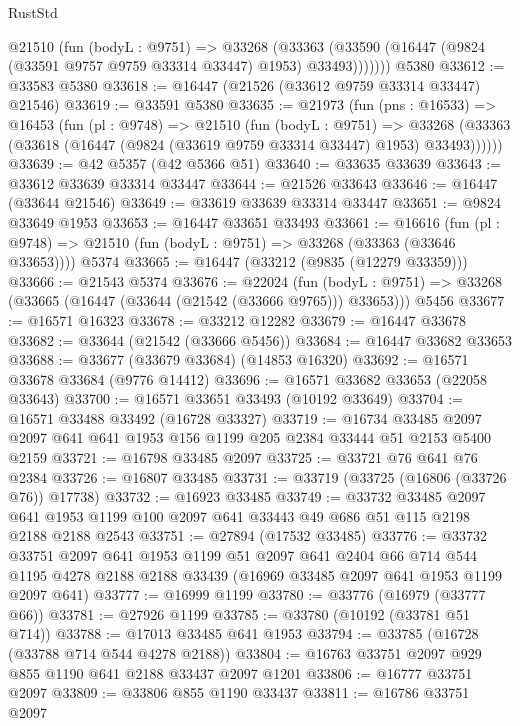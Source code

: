 \begin{lexlean}{RustStd}
\begin{coremodule}
        @21510
          (fun (bodyL : @9751) =>
          @33268
            (@33363 (@33590 (@16447 (@9824 (@33591 @9757 @9759 @33314 @33447) @1953) @33493)))))))
    @5380
@33612 := @33583 @5380
@33618 := @16447 (@21526 (@33612 @9759 @33314 @33447) @21546)
@33619 := @33591 @5380
@33635 := @21973
    (fun (pns : @16533) =>
    @16453
      (fun (pl : @9748) =>
      @21510
        (fun (bodyL : @9751) =>
        @33268 (@33363 (@33618 (@16447 (@9824 (@33619 @9759 @33314 @33447) @1953) @33493))))))
@33639 := @42 @5357 (@42 @5366 @51)
@33640 := @33635 @33639
@33643 := @33612 @33639 @33314 @33447
@33644 := @21526 @33643
@33646 := @16447 (@33644 @21546)
@33649 := @33619 @33639 @33314 @33447
@33651 := @9824 @33649 @1953
@33653 := @16447 @33651 @33493
@33661 := @16616
    (fun (pl : @9748) => @21510 (fun (bodyL : @9751) => @33268 (@33363 (@33646 @33653))))
    @5374
@33665 := @16447 (@33212 (@9835 (@12279 @33359)))
@33666 := @21543 @5374
@33676 := @22024
    (fun (bodyL : @9751) => @33268 (@33665 (@16447 (@33644 (@21542 (@33666 @9765))) @33653)))
    @5456
@33677 := @16571 @16323
@33678 := @33212 @12282
@33679 := @16447 @33678
@33682 := @33644 (@21542 (@33666 @5456))
@33684 := @16447 @33682 @33653
@33688 := @33677 (@33679 @33684) (@14853 @16320)
@33692 := @16571 @33678 @33684 (@9776 @14412)
@33696 := @16571 @33682 @33653 (@22058 @33643)
@33700 := @16571 @33651 @33493 (@10192 @33649)
@33704 := @16571 @33488 @33492 (@16728 @33327)
@33719 := @16734
    @33485
    @2097
    @2097
    @641
    @641
    @1953
    @156
    @1199
    @205
    @2384
    @33444
    @51
    @2153
    @5400
    @2159
@33721 := @16798 @33485 @2097
@33725 := @33721 @76 @641 @76 @2384
@33726 := @16807 @33485
@33731 := @33719 (@33725 (@16806 (@33726 @76)) @17738)
@33732 := @16923 @33485
@33749 := @33732
    @33485
    @2097
    @641
    @1953
    @1199
    @100
    @2097
    @641
    @33443
    @49
    @686
    @51
    @115
    @2198
    @2188
    @2188
    @2543
@33751 := @27894 (@17532 @33485)
@33776 := @33732
    @33751
    @2097
    @641
    @1953
    @1199
    @51
    @2097
    @641
    @2404
    @66
    @714
    @544
    @1195
    @4278
    @2188
    @2188
    @33439
    (@16969 @33485 @2097 @641 @1953 @1199 @2097 @641)
@33777 := @16999 @1199
@33780 := @33776 (@16979 (@33777 @66))
@33781 := @27926 @1199
@33785 := @33780 (@10192 (@33781 @51 @714))
@33788 := @17013 @33485 @641 @1953
@33794 := @33785 (@16728 (@33788 @714 @544 @4278 @2188))
@33804 := @16763 @33751 @2097 @929 @855 @1190 @641 @2188 @33437 @2097 @1201
@33806 := @16777 @33751 @2097
@33809 := @33806 @855 @1190 @33437
@33811 := @16786 @33751 @2097

\end{coremodule}
\end{lexlean}
